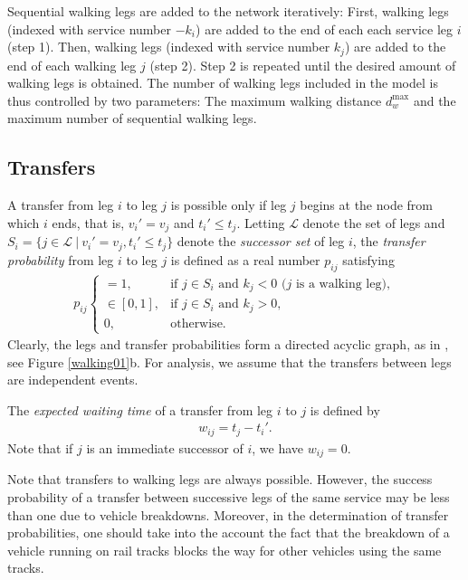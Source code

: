 \documentclass[dissertation,draft*]{aaltoseries}
\begin{document}
Sequential walking legs are added to the network iteratively:
First, walking legs (indexed with service number $-k_i$) are added to the end of each each service leg $i$ (step 1).
Then, walking legs (indexed with service number $k_j$) are added to the end of each walking leg $j$ (step 2).
Step 2 is repeated until the desired amount of walking legs is obtained.
The number of walking legs included in the model is thus controlled by two parameters:
The maximum walking distance $d_w^{\max }$ and the maximum number of sequential walking legs.

\subsection{Transfers}
A transfer from leg $i$ to leg $j$ is possible only if leg $j$ begins at the node from which $i$ ends, 
that is, $v_{i}' = v_{j}$ and $t_i' \leq t_j$.
Letting $\mathcal{L}$ denote the set of legs and $S_i = \{j \in \mathcal{L} \ | \ v_{i}' = v_{j}, t_i' \leq t_j \}$ denote the 
\emph{successor set} of leg $i$,
the \emph{transfer probability} from leg $i$ to leg $j$ is defined as a real number $p_{ij}$ satisfying
\begin{align}
\label{transferprob}
p_{ij}
\left\{
\begin{array}{ll}
= 1, & \mbox{if $j \in S_{i}$ and $k_j < 0$ \ \ ($j$ is a walking leg)}, \\
\in [0,1], & \mbox{if $j \in S_{i}$ and $k_j > 0$}, \\ %
0, & \mbox{otherwise.}
\end{array}
\right.
\end{align}
Clearly, the legs and transfer probabilities
form a directed acyclic graph, as in \cite{psaraftis93}, see Figure \ref{walking01}b. 
For analysis, we assume that the transfers between legs are independent events.

The \emph{expected waiting time} of a transfer from leg $i$ to $j$ is defined by 
\begin{align}
\label{waitingtime}
 w_{ij} = t_j - t_i'.
\end{align}
Note that if $j$ is an immediate successor of $i$, we have $w_{ij} = 0$. 

Note that transfers to walking legs are always possible. However, the success probability 
of a transfer between successive legs of the same service may be less than one due to vehicle breakdowns.
Moreover, in the determination of transfer probabilities,
one should take into the account the fact that the breakdown of a vehicle running on rail tracks blocks the way for
other vehicles using the same tracks.
\end{document}
